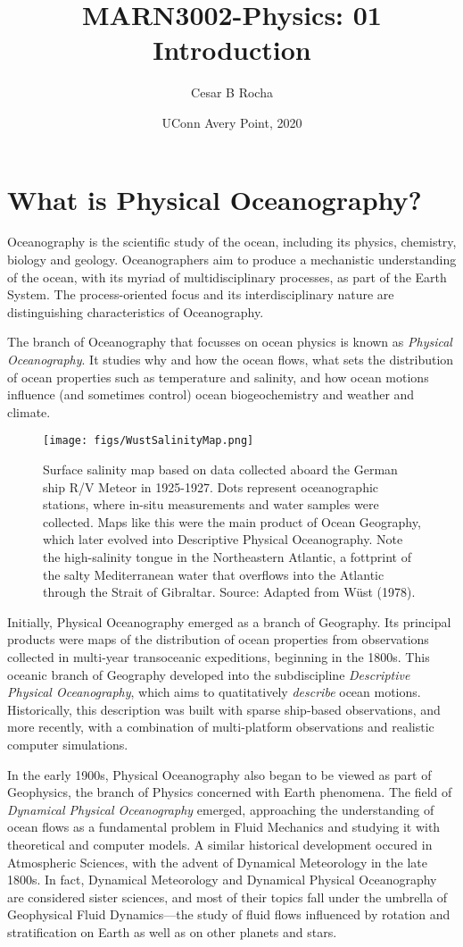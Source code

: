 \documentclass[11pt]{article}
\title{MARN3002-Physics: 01 Introduction}
\author{Cesar B Rocha}
\date{UConn Avery Point, 2020}
\newcommand{\PO}{Physical Oceanography}
\begin{document}
\maketitle

\section{What is Physical Oceanography?}
Oceanography is the scientific study of the ocean, including its physics,
chemistry, biology and geology.  Oceanographers aim to produce a mechanistic understanding
of the ocean, with its myriad of multidisciplinary processes,
as part of the Earth System. The process-oriented focus and its interdisciplinary nature
are distinguishing characteristics of Oceanography.

The branch of Oceanography that focusses on ocean physics is known as \emph{Physical
Oceanography}. It studies why and how the ocean flows, what sets the distribution
of ocean properties such as temperature and salinity, and how ocean motions
influence (and sometimes control) ocean biogeochemistry and weather and climate.



\begin{figure}[H]\label{wustmap}
\centering
\texttt{[image: figs/WustSalinityMap.png]}
\caption{\small Surface salinity map based on data collected aboard the German ship
R/V Meteor in 1925-1927. Dots represent oceanographic stations, where in-situ measurements and
water samples were collected. Maps like this were the main product of Ocean Geography,
which later evolved into Descriptive \PO. Note the high-salinity tongue in the Northeastern
Atlantic, a fottprint of the salty Mediterranean water that overflows into the Atlantic
through the Strait of Gibraltar. Source: Adapted from Wüst (1978).}
\end{figure}

Initially, \PO{} emerged as a branch of Geography. Its principal products were maps
of the distribution of ocean properties from observations collected in multi-year
transoceanic expeditions, beginning in the 1800s. This oceanic branch of Geography
developed into the subdiscipline \emph{Descriptive \PO{}}, which aims to quatitatively
\emph{describe} ocean motions. Historically, this description was built
with sparse ship-based observations, and more recently, with a combination of
multi-platform observations and realistic computer simulations.

In the early 1900s, \PO{} also began to be viewed as part of
Geophysics, the branch of Physics concerned with Earth phenomena. The field of
\emph{Dynamical \PO{}} emerged, approaching the understanding of ocean flows as a
fundamental problem in Fluid Mechanics and studying it with theoretical and computer
models. A similar historical development occured in
Atmospheric Sciences, with the advent of Dynamical Meteorology in the late 1800s.
In fact, Dynamical Meteorology and Dynamical \PO{} are considered sister sciences,
and most of their topics fall under the umbrella of Geophysical Fluid
Dynamics––the study of fluid flows influenced by rotation and
stratification on Earth as well as on other planets and stars.
\end{document}

